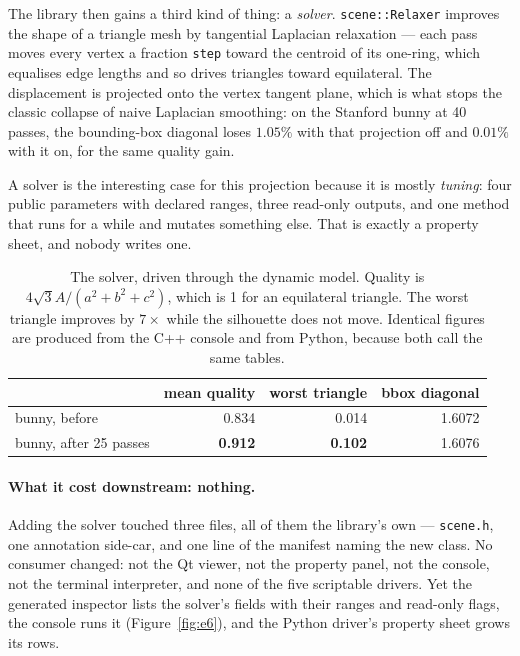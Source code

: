 \documentclass[11pt,a4paper]{article}
\newcommand{\code}[1]{\texttt{\small #1}}
\begin{document}
The library then gains a third kind of thing: a \emph{solver}.
\code{scene::Relaxer} improves the shape of a triangle mesh by tangential
Laplacian relaxation --- each pass moves every vertex a fraction \code{step}
toward the centroid of its one-ring, which equalises edge lengths and so drives
triangles toward equilateral. The displacement is projected onto the vertex
tangent plane, which is what stops the classic collapse of naive Laplacian
smoothing: on the Stanford bunny at 40 passes, the bounding-box diagonal loses
$1.05\%$ with that projection off and $0.01\%$ with it on, for the same quality
gain.

A solver is the interesting case for this projection because it is mostly
\emph{tuning}: four public parameters with declared ranges, three read-only
outputs, and one method that runs for a while and mutates something else. That
is exactly a property sheet, and nobody writes one.

\begin{table}[h]
\centering\small
\begin{tabular}{lrrr}
\toprule
 & mean quality & worst triangle & bbox diagonal \\
\midrule
bunny, before      & 0.834 & 0.014 & 1.6072 \\
bunny, after 25 passes & \textbf{0.912} & \textbf{0.102} & 1.6076 \\
\bottomrule
\end{tabular}
\caption{The solver, driven through the dynamic model. Quality is
$4\sqrt{3}A/(a^2{+}b^2{+}c^2)$, which is 1 for an equilateral triangle. The
worst triangle improves by $7\times$ while the silhouette does not move.
Identical figures are produced from the C++ console and from Python, because
both call the same tables.}
\label{tab:e6}
\end{table}

\paragraph{What it cost downstream: nothing.} Adding the solver touched three
files, all of them the library's own --- \code{scene.h}, one annotation
side-car, and one line of the manifest naming the new class. No consumer
changed: not the Qt viewer, not the property panel, not the console, not the
terminal interpreter, and none of the five scriptable drivers. Yet the generated
inspector lists the solver's fields with their ranges and read-only flags, the
console runs it (Figure~\ref{fig:e6}), and the Python driver's property sheet
grows its rows.
\end{document}
